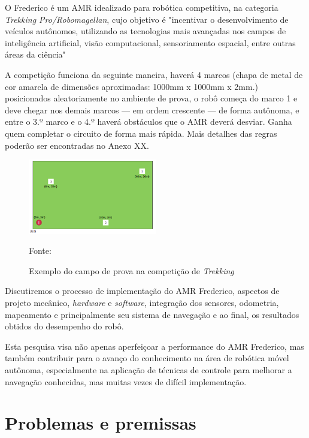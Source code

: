 O Frederico é um AMR idealizado para robótica competitiva, na categoria \emph{Trekking Pro/Robomagellan}, cujo objetivo é "incentivar o desenvolvimento de veículos autônomos, utilizando as tecnologias mais avançadas nos campos de inteligência artificial, visão computacional, sensoriamento espacial, entre outras áreas da ciência"\cite{robocore}

A competição funciona da seguinte maneira, haverá 4 marcos (chapa de metal de cor amarela de dimensões aproximadas: 1000mm x 1000mm x 2mm.) posicionados aleatoriamente no ambiente de prova, o robô começa do marco 1 e deve chegar nos demais marcos — em ordem crescente — de forma autônoma, e entre o 3.º marco e o 4.º haverá obstáculos que o AMR deverá desviar. Ganha quem completar o circuito de forma mais rápida. Mais detalhes das regras poderão ser encontradas no Anexo XX.

\begin{figure}[h]
    \centering
    \captionsetup{justification=centering}
    \caption{\small Exemplo do campo de prova na competição de \emph{Trekking}}
    \includegraphics[width=0.5\textwidth]{imagens/ex-prova-trekking.png}
    
    {\small Fonte: \cite{robocore}}
\end{figure}

Discutiremos o processo de implementação do AMR Frederico, aspectos de projeto mecânico, \emph{hardware} e \emph{software}, integração dos sensores, odometria, mapeamento e principalmente seu sistema de navegação e ao final, os resultados obtidos do desempenho do robô. 

Esta pesquisa visa não apenas aperfeiçoar a performance do AMR Frederico, mas também contribuir para o avanço do conhecimento na área de robótica móvel autônoma, especialmente na aplicação de técnicas de controle para melhorar a navegação conhecidas, mas muitas vezes de difícil implementação.


\section{\textbf{Problemas e premissas}}

